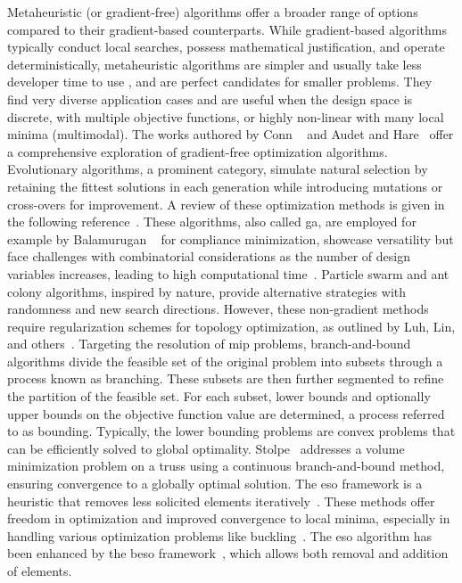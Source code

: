 Metaheuristic (or gradient-free) algorithms offer a broader range of options compared to their gradient-based counterparts. While gradient-based algorithms typically conduct local searches, possess mathematical justification, and operate deterministically, metaheuristic algorithms are simpler and usually take less developer time to use , and are perfect candidates for smaller problems. They find very diverse application cases and are useful when the design space is discrete, with multiple objective functions, or highly non-linear with many local minima (multimodal). The works authored by Conn \etal~ and Audet and Hare~ offer a comprehensive exploration of gradient-free optimization algorithms. Evolutionary algorithms, a prominent category, simulate natural selection by retaining the fittest solutions in each generation while introducing mutations or cross-overs for improvement. A review of these optimization methods is given in the following reference~. These algorithms, also called \gls{ga}, are employed for example by Balamurugan \etal~ for compliance minimization, showcase versatility but face challenges with combinatorial considerations as the number of design variables increases, leading to high computational time~. Particle swarm and ant colony algorithms, inspired by nature, provide alternative strategies with randomness and new search directions. However, these non-gradient methods require regularization schemes for topology optimization, as outlined by Luh, Lin, and others~.
Targeting the resolution of \gls{mip} problems, branch-and-bound algorithms divide the feasible set of the original problem into subsets through a process known as branching. These subsets are then further segmented to refine the partition of the feasible set. For each subset, lower bounds and optionally upper bounds on the objective function value are determined, a process referred to as bounding. Typically, the lower bounding problems are convex problems that can be efficiently solved to global optimality. Stolpe~ addresses a volume minimization problem on a truss using a continuous branch-and-bound method, ensuring convergence to a globally optimal solution. The \gls{eso} framework is a heuristic that removes less solicited elements iteratively~. These methods offer freedom in optimization and improved convergence to local minima, especially in handling various optimization problems like buckling~. The \gls{eso} algorithm has been enhanced by the \gls{beso} framework~, which allows both removal and addition of elements. 

